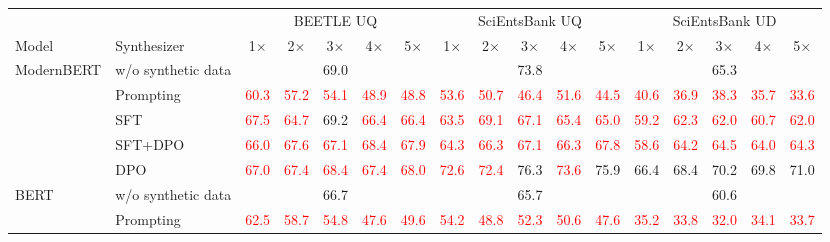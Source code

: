 \begin{table}[t]
\centering
\footnotesize
\setlength{\tabcolsep}{2pt}
\begin{tabular}{llccccccccccccccc}
\toprule
 & & \multicolumn{5}{c}{BEETLE UQ} & \multicolumn{5}{c}{SciEntsBank UQ} & \multicolumn{5}{c}{SciEntsBank UD} \\
\cmidrule(lr){3-7}\cmidrule(lr){8-12}\cmidrule(lr){13-17}
Model & Synthesizer & 1$\times$ & 2$\times$ & 3$\times$ & 4$\times$ & 5$\times$ & 1$\times$ & 2$\times$ & 3$\times$ & 4$\times$ & 5$\times$ & 1$\times$ & 2$\times$ & 3$\times$ & 4$\times$ & 5$\times$ \\
\midrule
\multirow{5}{*}{ModernBERT} & w/o synthetic data & \multicolumn{5}{c}{69.0} & \multicolumn{5}{c}{73.8} & \multicolumn{5}{c}{65.3} \\
 & Prompting & \textcolor{red}{60.3} & \textcolor{red}{57.2} & \textcolor{red}{54.1} & \textcolor{red}{48.9} & \textcolor{red}{48.8} & \textcolor{red}{53.6} & \textcolor{red}{50.7} & \textcolor{red}{46.4} & \textcolor{red}{51.6} & \textcolor{red}{44.5} & \textcolor{red}{40.6} & \textcolor{red}{36.9} & \textcolor{red}{38.3} & \textcolor{red}{35.7} & \textcolor{red}{33.6} \\
 & SFT & \textcolor{red}{67.5} & \textcolor{red}{64.7} & 69.2 & \textcolor{red}{66.4} & \textcolor{red}{66.4} & \textcolor{red}{63.5} & \textcolor{red}{69.1} & \textcolor{red}{67.1} & \textcolor{red}{65.4} & \textcolor{red}{65.0} & \textcolor{red}{59.2} & \textcolor{red}{62.3} & \textcolor{red}{62.0} & \textcolor{red}{60.7} & \textcolor{red}{62.0} \\
 & SFT+DPO & \textcolor{red}{66.0} & \textcolor{red}{67.6} & \textcolor{red}{67.1} & \textcolor{red}{68.4} & \textcolor{red}{67.9} & \textcolor{red}{64.3} & \textcolor{red}{66.3} & \textcolor{red}{67.1} & \textcolor{red}{66.3} & \textcolor{red}{67.8} & \textcolor{red}{58.6} & \textcolor{red}{64.2} & \textcolor{red}{64.5} & \textcolor{red}{64.0} & \textcolor{red}{64.3} \\
 & DPO & \textcolor{red}{67.0} & \textcolor{red}{67.4} & \textcolor{red}{68.4} & \textcolor{red}{67.4} & \textcolor{red}{68.0} & \textcolor{red}{72.6} & \textcolor{red}{72.4} & 76.3 & \textcolor{red}{73.6} & 75.9 & 66.4 & 68.4 & 70.2 & 69.8 & 71.0 \\
\midrule
\multirow{5}{*}{BERT} & w/o synthetic data & \multicolumn{5}{c}{66.7} & \multicolumn{5}{c}{65.7} & \multicolumn{5}{c}{60.6} \\
 & Prompting & \textcolor{red}{62.5} & \textcolor{red}{58.7} & \textcolor{red}{54.8} & \textcolor{red}{47.6} & \textcolor{red}{49.6} & \textcolor{red}{54.2} & \textcolor{red}{48.8} & \textcolor{red}{52.3} & \textcolor{red}{50.6} & \textcolor{red}{47.6} & \textcolor{red}{35.2} & \textcolor{red}{33.8} & \textcolor{red}{32.0} & \textcolor{red}{34.1} & \textcolor{red}{33.7} \\

\end{tabular}
\end{table}
